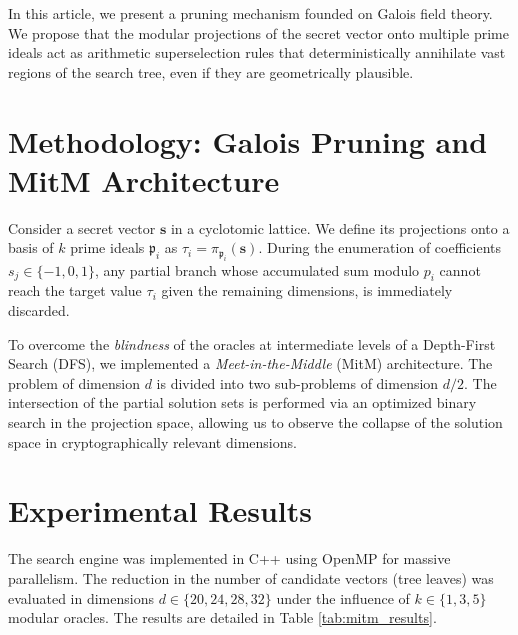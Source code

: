\documentclass[sn-mathphys, a4paper]{sn-jnl}
\begin{document}
In this article, we present a pruning mechanism founded on Galois field theory. We propose that the modular projections of the secret vector onto multiple prime ideals act as arithmetic superselection rules that deterministically annihilate vast regions of the search tree, even if they are geometrically plausible.

\section{Methodology: Galois Pruning and MitM Architecture}

Consider a secret vector $\mathbf{s}$ in a cyclotomic lattice. We define its projections onto a basis of $k$ prime ideals $\mathfrak{p}_i$ as $\tau_i = \pi_{\mathfrak{p}_i}(\mathbf{s})$. During the enumeration of coefficients $s_j \in \{-1, 0, 1\}$, any partial branch whose accumulated sum modulo $p_i$ cannot reach the target value $\tau_i$ given the remaining dimensions, is immediately discarded.

To overcome the \textit{blindness} of the oracles at intermediate levels of a Depth-First Search (DFS), we implemented a \textit{Meet-in-the-Middle} (MitM) architecture. The problem of dimension $d$ is divided into two sub-problems of dimension $d/2$. The intersection of the partial solution sets is performed via an optimized binary search in the projection space, allowing us to observe the collapse of the solution space in cryptographically relevant dimensions.

\section{Experimental Results}

The search engine was implemented in C++ using OpenMP for massive parallelism. The reduction in the number of candidate vectors (tree leaves) was evaluated in dimensions $d \in \{20, 24, 28, 32\}$ under the influence of $k \in \{1, 3, 5\}$ modular oracles. The results are detailed in Table \ref{tab:mitm_results}.
\end{document}
